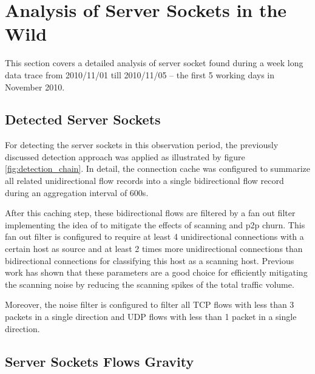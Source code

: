 \newpage
\section{Analysis of Server Sockets in the Wild}

This section covers a detailed analysis of server socket found during a week long data trace from 2010/11/01 till 2010/11/05 -- the first 5 working days in November 2010.

\subsection{Detected Server Sockets}

For detecting the server sockets in this observation period, the previously 
discussed detection approach was applied as illustrated by figure 
\ref{fig:detection_chain}. In detail, the connection cache was configured to 
summarize all related unidirectional flow records into a single bidirectional 
flow record during an aggregation interval of 600s. 

After this caching step, these bidirectional flows are filtered by a fan out 
filter implementing the idea of \citet{Allman:2007} to mitigate the effects of 
scanning and p2p churn. This fan out filter is configured to require at least 4 
unidirectional connections with a certain host as source and at least 2 times 
more unidirectional connections than bidirectional connections for classifying 
this host as a scanning host. Previous work\citep{Schatzmann:Mining,Schatzmann:Dissection, Schatzmann:Tracing} has shown that these parameters are a good choice for efficiently mitigating the scanning noise by reducing the scanning spikes of the total traffic volume. 

Moreover, the noise filter is configured to filter all TCP flows with less than 3 packets in a single direction and UDP flows with less than 1 packet in a single direction. 


\subsection{Server Sockets Flows Gravity}


